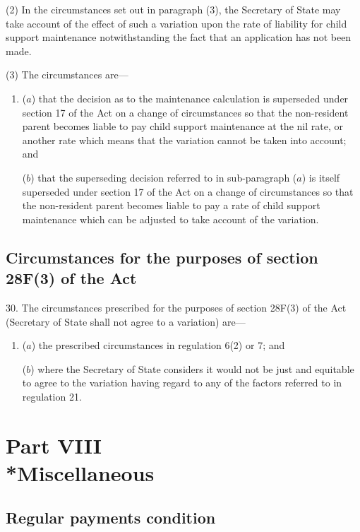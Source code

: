 \documentclass[12pt,a4paper]{article}
\begin{document}
(2) In the circumstances set out in paragraph (3), the Secretary of State may take account of the effect of such a variation upon the rate of liability for child support maintenance notwithstanding the fact that an application has not been made.

(3) The circumstances are—
\begin{enumerate}\item[]
($a$) that the decision as to the maintenance calculation is superseded under section 17 of the Act on a change of circumstances so that the non-resident parent becomes liable to pay child support maintenance at the nil rate, or another rate which means that the variation cannot be taken into account; and

($b$) that the superseding decision referred to in sub-paragraph ($a$)  is itself superseded under section 17 of the Act on a change of circumstances so that the non-resident parent becomes liable to pay a rate of child support maintenance which can be adjusted to take account of the variation.
\end{enumerate}

\subsection[30. Circumstances for the purposes of section 28F(3) of the Act]{Circumstances for the purposes of section 28F(3) of the Act}

30.  The circumstances prescribed for the purposes of section 28F(3) of the Act (Secretary of State shall not agree to a variation) are—
\begin{enumerate}\item[]
($a$) the prescribed circumstances in regulation 6(2) or 7; and

($b$) where the Secretary of State considers it would not be just and equitable to agree to the variation having regard to any of the factors referred to in regulation 21.
\end{enumerate}

\section[Part VIII --- Miscellaneous]{Part VIII\\*Miscellaneous}

\subsection[31. Regular payments condition]{Regular payments condition}
\end{document}
